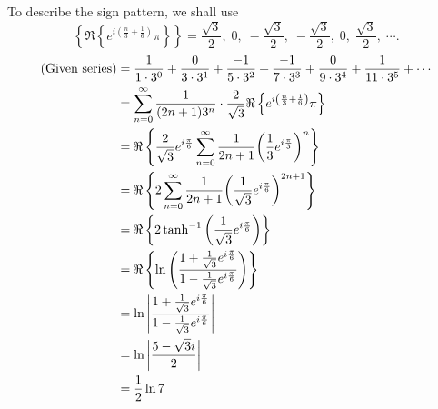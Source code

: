 \item

To describe the sign pattern, we shall use
\[
	\left\{ \Re \left\{ e^{i \left( \frac{n}{3} + \frac{1}{6} \right)} \pi \right\} \right\}
	= \frac{\sqrt{3}}{2},\; 0,\; -\frac{\sqrt{3}}{2},\; -\frac{\sqrt{3}}{2},\; 0,\; \frac{\sqrt{3}}{2},\; \cdots.
\]
\begin{align*}
	(\text{Given series})
	 & = \frac{1}{1 \cdot 3^0} + \frac{0}{3 \cdot 3^1} + \frac{-1}{5 \cdot 3^2} + \frac{-1}{7 \cdot 3^3} + \frac{0}{9 \cdot 3^4} + \frac{1}{11 \cdot 3^5} + \cdots \\
	 & = \sum_{n = 0}^\infty \frac{1}{(2n + 1) 3^n} \cdot \frac{2}{\sqrt{3}} \Re \left\{ e^{i \left( \frac{n}{3} + \frac{1}{6} \right)} \pi \right\}               \\
	 & = \Re \left\{ \frac{2}{\sqrt{3}} e^{i \frac{\pi}{6}} \sum_{n = 0}^\infty \frac{1}{2n + 1} {\left( \frac{1}{3} e^{i \frac{\pi}{3}} \right)}^n \right\}       \\
	 & = \Re \left\{ 2 \sum_{n = 0}^\infty \frac{1}{2n + 1} {\left( \frac{1}{\sqrt{3}} e^{i \frac{\pi}{6}} \right)}^{2n + 1} \right\}                              \\
	 & = \Re \left\{ 2 \tanh^{-1} \left( \frac{1}{\sqrt{3}} e^{i\frac{\pi}{6}} \right) \right\}                                                                    \\
	 & = \Re \left\{ \ln \left( \frac{1 + \frac{1}{\sqrt{3}} e^{i\frac{\pi}{6}}}{1 - \frac{1}{\sqrt{3}} e^{i\frac{\pi}{6}}} \right) \right\}                       \\
	 & = \ln \left| \frac{1 + \frac{1}{\sqrt{3}} e^{i\frac{\pi}{6}}}{1 - \frac{1}{\sqrt{3}} e^{i\frac{\pi}{6}}} \right|                                            \\
	 & = \ln \left| \frac{5 - \sqrt{3} i}{2} \right|                                                                                                               \\
	 & = \frac{1}{2} \ln 7
\end{align*}
